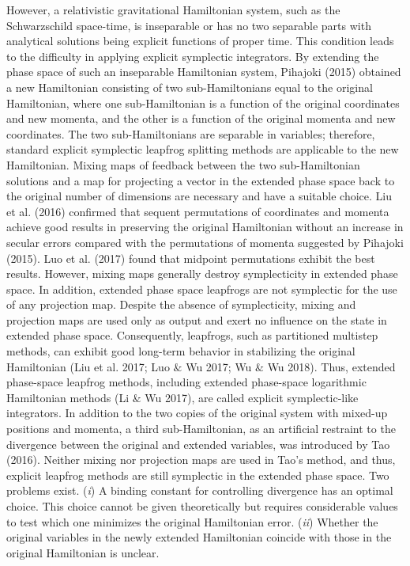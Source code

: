 \documentclass[preprint2]{aastex}
\begin{document}
However, a relativistic gravitational Hamiltonian system, such as
the Schwarzschild space-time, is inseparable or has no two
separable parts with analytical solutions being explicit functions
of proper time. This condition leads to the difficulty in applying
explicit symplectic integrators.  By extending the phase space of
such an inseparable Hamiltonian system,  Pihajoki (2015) obtained
a new Hamiltonian consisting of two sub-Hamiltonians equal to the
original Hamiltonian, where one sub-Hamiltonian is a function of
the original coordinates and new momenta, and the other is a
function of the original momenta and new coordinates. The two
sub-Hamiltonians are separable in variables; therefore, standard
explicit symplectic leapfrog splitting methods are applicable to
the new Hamiltonian. Mixing maps of feedback between the two
sub-Hamiltonian solutions and a map for projecting a vector in the
extended phase space back to the original number of dimensions are
necessary and have a suitable choice. Liu et al. (2016) confirmed
that sequent permutations of coordinates and momenta achieve good
results in preserving the original Hamiltonian without an increase
in secular errors compared with the permutations of momenta
suggested by Pihajoki (2015). Luo et al. (2017) found that
midpoint permutations exhibit the best results. However, mixing
maps generally destroy symplecticity in extended phase space. In
addition, extended phase space leapfrogs are not symplectic for
the use of any projection map. Despite the absence of
symplecticity, mixing and projection maps are used only as output
and exert no influence on the state in extended phase space.
Consequently, leapfrogs, such as partitioned multistep methods,
can exhibit good long-term behavior in stabilizing the original
Hamiltonian (Liu et al. 2017; Luo $\&$ Wu 2017;  Wu $\&$ Wu 2018).
Thus, extended phase-space leapfrog methods, including extended
phase-space logarithmic Hamiltonian methods (Li $\&$ Wu 2017), are
called explicit symplectic-like integrators. In addition to the
two copies of the original system with mixed-up positions and
momenta, a third sub-Hamiltonian, as an artificial restraint to
the divergence between the original  and extended variables, was
introduced by Tao (2016). Neither mixing nor projection maps are
used in Tao's method, and thus, explicit leapfrog methods are
still symplectic in the extended phase space. Two problems exist.
(\emph{i}) A binding constant for controlling divergence has an
optimal choice. This choice cannot be given theoretically but
requires considerable values to test which one minimizes the
original Hamiltonian error. (\emph{ii}) Whether the original
variables in the newly extended Hamiltonian coincide with those in
the original Hamiltonian is unclear.
\end{document}
